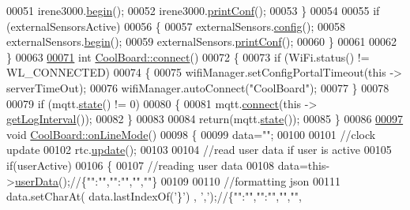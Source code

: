\begin{DoxyCode}
00051         irene3000.\hyperlink{class_irene3000_ad5891806c500ae1007afe52b9e304c2b}{begin}();
00052         irene3000.\hyperlink{class_irene3000_a7bc2414100b5e19eacc6630fa34b2654}{printConf}();
00053     \}
00054 
00055     \textcolor{keywordflow}{if} (externalSensorsActive)
00056     \{
00057         externalSensors.\hyperlink{class_external_sensors_a862a4bd11346b37270d0244c2adabe5a}{config}();
00058         externalSensors.\hyperlink{class_external_sensors_a58ede0d786a86417254708870f04a21e}{begin}();
00059         externalSensors.\hyperlink{class_external_sensors_a78c2bf55084435dd51d3c559b2d3c6f3}{printConf}();
00060     \}
00061 
00062 \}
00063 
\hyperlink{class_cool_board_a519de78b807f8ec6463ff484eb925918}{00071} \textcolor{keywordtype}{int} \hyperlink{class_cool_board_a519de78b807f8ec6463ff484eb925918}{CoolBoard::connect}()
00072 \{
00073     \textcolor{keywordflow}{if} (WiFi.status() != WL\_CONNECTED)
00074     \{
00075         wifiManager.setConfigPortalTimeout(\textcolor{keyword}{this} -> serverTimeOut);
00076         wifiManager.autoConnect(\textcolor{stringliteral}{"CoolBoard"});
00077     \}
00078 
00079     \textcolor{keywordflow}{if} (mqtt.\hyperlink{class_cool_m_q_t_t_a5d003307eff78efbd585e42b43b72b6d}{state}() != 0)
00080     \{
00081         mqtt.\hyperlink{class_cool_m_q_t_t_a58b0b1f64b269c2681685208262fba1d}{connect}(\textcolor{keyword}{this} -> \hyperlink{class_cool_board_aaa24480b273fc095a1356a589c333781}{getLogInterval}());
00082     \}
00083 
00084     \textcolor{keywordflow}{return}(mqtt.\hyperlink{class_cool_m_q_t_t_a5d003307eff78efbd585e42b43b72b6d}{state}());
00085 \}
00086 
\hyperlink{class_cool_board_aa0bbc4bc605e35618d18e68795c61363}{00097} \textcolor{keywordtype}{void} \hyperlink{class_cool_board_aa0bbc4bc605e35618d18e68795c61363}{CoolBoard::onLineMode}()
00098 \{
00099     data=\textcolor{stringliteral}{""};
00100 
00101     \textcolor{comment}{//clock update}
00102     rtc.\hyperlink{class_cool_time_aae601f795452cfa48d9fb337aed483a8}{update}();
00103 
00104     \textcolor{comment}{//read user data if user is active}
00105     \textcolor{keywordflow}{if}(userActive)
00106     \{
00107         \textcolor{comment}{//reading user data}
00108         data=this->\hyperlink{class_cool_board_ae7358fb6e623cfc81b775f5f1734909b}{userData}();\textcolor{comment}{//\{"":"","":"","",""\}}
00109 
00110         \textcolor{comment}{//formatting json }
00111         data.setCharAt( data.lastIndexOf(\textcolor{charliteral}{'\}'}) , \textcolor{charliteral}{','});\textcolor{comment}{//\{"":"","":"","","",}

\end{DoxyCode}
